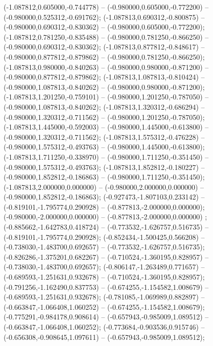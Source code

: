  (-1.087812,0.605000,-0.744778) -- (-0.980000,0.605000,-0.772200) -- (-0.980000,0.525312,-0.691762);
 (-1.087813,0.690312,-0.800875) -- (-0.980000,0.690312,-0.830362) -- (-0.980000,0.605000,-0.772200);
 (-1.087812,0.781250,-0.835488) -- (-0.980000,0.781250,-0.866250) -- (-0.980000,0.690312,-0.830362);
 (-1.087813,0.877812,-0.848617) -- (-0.980000,0.877812,-0.879862) -- (-0.980000,0.781250,-0.866250);
 (-1.087813,0.980000,-0.840263) -- (-0.980000,0.980000,-0.871200) -- (-0.980000,0.877812,-0.879862);
 (-1.087813,1.087813,-0.810424) -- (-0.980000,1.087813,-0.840262) -- (-0.980000,0.980000,-0.871200);
 (-1.087813,1.201250,-0.759101) -- (-0.980000,1.201250,-0.787050) -- (-0.980000,1.087813,-0.840262);
 (-1.087813,1.320312,-0.686294) -- (-0.980000,1.320312,-0.711562) -- (-0.980000,1.201250,-0.787050);
 (-1.087813,1.445000,-0.592003) -- (-0.980000,1.445000,-0.613800) -- (-0.980000,1.320312,-0.711562);
 (-1.087813,1.575312,-0.476228) -- (-0.980000,1.575312,-0.493763) -- (-0.980000,1.445000,-0.613800);
 (-1.087813,1.711250,-0.338970) -- (-0.980000,1.711250,-0.351450) -- (-0.980000,1.575312,-0.493763);
 (-1.087813,1.852812,-0.180227) -- (-0.980000,1.852812,-0.186863) -- (-0.980000,1.711250,-0.351450);
 (-1.087813,2.000000,0.000000) -- (-0.980000,2.000000,0.000000) -- (-0.980000,1.852812,-0.186863);
 (-0.927473,-1.807103,0.233142) -- (-0.819101,-1.795774,0.290928) -- (-0.877813,-2.000000,0.000000);
 (-0.980000,-2.000000,0.000000) -- (-0.877813,-2.000000,0.000000) ;
 (-0.885662,-1.642783,0.418724) -- (-0.773532,-1.626757,0.516735) -- (-0.819101,-1.795774,0.290928);
 (-0.852434,-1.500425,0.566208) -- (-0.738030,-1.483700,0.692657) -- (-0.773532,-1.626757,0.516735);
 (-0.826286,-1.375201,0.682267) -- (-0.710524,-1.360195,0.828957) -- (-0.738030,-1.483700,0.692657);
 (-0.806147,-1.263489,0.771657) -- (-0.689593,-1.251631,0.932678) -- (-0.710524,-1.360195,0.828957);
 (-0.791256,-1.162490,0.837753) -- (-0.674255,-1.154582,1.008679) -- (-0.689593,-1.251631,0.932678);
 (-0.781085,-1.069989,0.882897) -- (-0.663847,-1.066408,1.060252) -- (-0.674255,-1.154582,1.008679);
 (-0.775291,-0.984178,0.908614) -- (-0.657943,-0.985009,1.089512) -- (-0.663847,-1.066408,1.060252);
 (-0.773684,-0.903536,0.915746) -- (-0.656308,-0.908645,1.097611) -- (-0.657943,-0.985009,1.089512);
